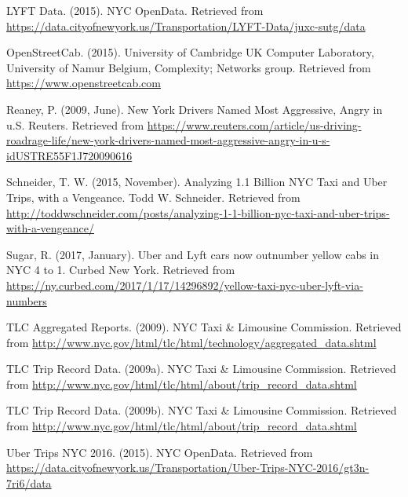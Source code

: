\documentclass[12pt,twoside]{reedthesis}
\theoremstyle{definition}
\theoremstyle{definition}
\theoremstyle{definition}
\theoremstyle{remark}
\begin{document}
\hypertarget{ref-datalyft}{}
LYFT Data. (2015). NYC OpenData. Retrieved from
\url{https://data.cityofnewyork.us/Transportation/LYFT-Data/juxc-sutg/data}

\hypertarget{ref-appone}{}
OpenStreetCab. (2015). University of Cambridge UK Computer Laboratory,
University of Namur Belgium, Complexity; Networks group. Retrieved from
\url{https://www.openstreetcab.com}

\hypertarget{ref-reaney2009}{}
Reaney, P. (2009, June). New York Drivers Named Most Aggressive, Angry
in u.S. Reuters. Retrieved from
\url{https://www.reuters.com/article/us-driving-roadrage-life/new-york-drivers-named-most-aggressive-angry-in-u-s-idUSTRE55F1J720090616}

\hypertarget{ref-schneider2015}{}
Schneider, T. W. (2015, November). Analyzing 1.1 Billion NYC Taxi and
Uber Trips, with a Vengeance. Todd W. Schneider. Retrieved from
\url{http://toddwschneider.com/posts/analyzing-1-1-billion-nyc-taxi-and-uber-trips-with-a-vengeance/}

\hypertarget{ref-sugar2017}{}
Sugar, R. (2017, January). Uber and Lyft cars now outnumber yellow cabs
in NYC 4 to 1. Curbed New York. Retrieved from
\url{https://ny.curbed.com/2017/1/17/14296892/yellow-taxi-nyc-uber-lyft-via-numbers}

\hypertarget{ref-datayellowmonth}{}
TLC Aggregated Reports. (2009). NYC Taxi \& Limousine Commission.
Retrieved from
\url{http://www.nyc.gov/html/tlc/html/technology/aggregated_data.shtml}

\hypertarget{ref-datayellow}{}
TLC Trip Record Data. (2009a). NYC Taxi \& Limousine Commission.
Retrieved from
\url{http://www.nyc.gov/html/tlc/html/about/trip_record_data.shtml}

\hypertarget{ref-datauber}{}
TLC Trip Record Data. (2009b). NYC Taxi \& Limousine Commission.
Retrieved from
\url{http://www.nyc.gov/html/tlc/html/about/trip_record_data.shtml}

\hypertarget{ref-datauberweek}{}
Uber Trips NYC 2016. (2015). NYC OpenData. Retrieved from
\url{https://data.cityofnewyork.us/Transportation/Uber-Trips-NYC-2016/gt3n-7ri6/data}


\end{document}
